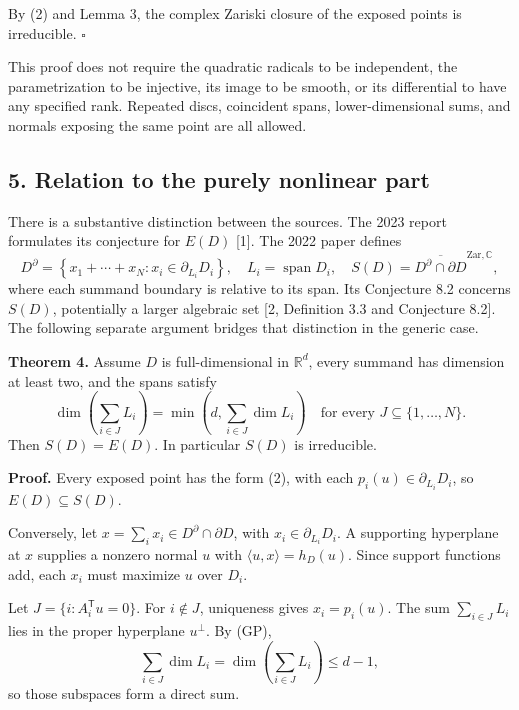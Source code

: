 \documentclass[
  11pt,
  letterpaper,
]{article}
\begin{document}
By (2) and Lemma 3, the complex Zariski closure of the exposed points is
irreducible. \(\square\)

This proof does not require the quadratic radicals to be independent,
the parametrization to be injective, its image to be smooth, or its
differential to have any specified rank. Repeated discs, coincident
spans, lower-dimensional sums, and normals exposing the same point are
all allowed.

\subsection{5. Relation to the purely nonlinear
part}\label{relation-to-the-purely-nonlinear-part}

There is a substantive distinction between the sources. The 2023 report
formulates its conjecture for \(E(D)\) {[}1{]}. The 2022 paper defines
\[
D^{\partial}=\left\{x_1+\cdots+x_N:x_i\in\partial_{L_i}D_i\right\},
\quad L_i=\operatorname{span}D_i,
\quad S(D)=\overline{D^{\partial}\cap\partial D}^{\mathrm{Zar},\mathbb C},
\] where each summand boundary is relative to its span. Its Conjecture
8.2 concerns \(S(D)\), potentially a larger algebraic set {[}2,
Definition 3.3 and Conjecture 8.2{]}. The following separate argument
bridges that distinction in the generic case.

\textbf{Theorem 4.} Assume \(D\) is full-dimensional in \(\mathbb R^d\),
every summand has dimension at least two, and the spans satisfy \[
\dim\left(\sum_{i\in J}L_i\right)
 =\min\left(d,\sum_{i\in J}\dim L_i\right)
\quad\text{for every }J\subseteq\{1,\ldots,N\}. \tag{GP}
\] Then \(S(D)=E(D)\). In particular \(S(D)\) is irreducible.

\textbf{Proof.} Every exposed point has the form (2), with each
\(p_i(u)\in\partial_{L_i}D_i\), so \(E(D)\subseteq S(D)\).

Conversely, let \(x=\sum_i x_i\in D^{\partial}\cap\partial D\), with
\(x_i\in\partial_{L_i}D_i\). A supporting hyperplane at \(x\) supplies a
nonzero normal \(u\) with \(\langle u,x\rangle=h_D(u)\). Since support
functions add, each \(x_i\) must maximize \(u\) over \(D_i\).

Let \(J=\{i:A_i^{\mathsf T}u=0\}\). For \(i\notin J\), uniqueness gives
\(x_i=p_i(u)\). The sum \(\sum_{i\in J}L_i\) lies in the proper
hyperplane \(u^\perp\). By (GP), \[
\sum_{i\in J}\dim L_i=\dim\left(\sum_{i\in J}L_i\right)\leq d-1,
\] so those subspaces form a direct sum.
\end{document}
